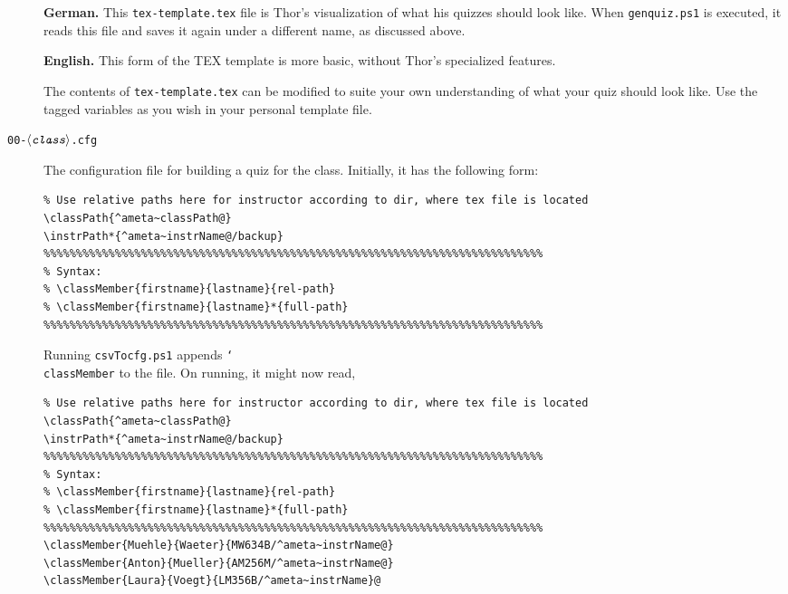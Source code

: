 \documentclass{article}
\let\pkg\textsf
\def\cs#1{\texttt{\char`\\#1}}
\def\ameta#1{\ensuremath{\langle\textit{\texttt{#1}}\rangle}}
\begin{document}
\begin{description}
      \textbf{German.} This \texttt{tex-template.tex} file is
      Thor's visualization of what his quizzes should look
      like. When \texttt{genquiz.ps1} is executed, it reads
      this file and saves it again under a different name, as
      discussed above.

      \textbf{English.} This form of the TEX template is more
      basic, without Thor's specialized features.

      The contents of \texttt{tex-template.tex} can be
      modified to suite your own understanding of what your
      quiz should look like. Use the tagged variables as you
      wish in your personal template file.

  \item[\normalfont\texttt{00-\ameta{class}.cfg}] The configuration file
      for building a quiz for the class. Initially, it has the
      following form:
\begin{Verbatim}[fontsize=\small,commandchars={^~@}]
% Reset the paths for \instrPath and \classPath for your system
% Use relative paths here for instructor according to dir, where tex file is located
\classPath{^ameta~classPath@}
\instrPath*{^ameta~instrName@/backup}
%%%%%%%%%%%%%%%%%%%%%%%%%%%%%%%%%%%%%%%%%%%%%%%%%%%%%%%%%%%%%%%%%%%%%%%%%%%%%
% Syntax:
% \classMember{firstname}{lastname}{rel-path}
% \classMember{firstname}{lastname}*{full-path}
%%%%%%%%%%%%%%%%%%%%%%%%%%%%%%%%%%%%%%%%%%%%%%%%%%%%%%%%%%%%%%%%%%%%%%%%%%%%%
\end{Verbatim}
Running \texttt{csvTocfg.ps1} appends \cs{classMember} to the file. On running, it might now read,
\begin{Verbatim}[fontsize=\small,commandchars={^~@}]
% Reset the paths for \instrPath and \classPath for your system
% Use relative paths here for instructor according to dir, where tex file is located
\classPath{^ameta~classPath@}
\instrPath*{^ameta~instrName@/backup}
%%%%%%%%%%%%%%%%%%%%%%%%%%%%%%%%%%%%%%%%%%%%%%%%%%%%%%%%%%%%%%%%%%%%%%%%%%%%%
% Syntax:
% \classMember{firstname}{lastname}{rel-path}
% \classMember{firstname}{lastname}*{full-path}
%%%%%%%%%%%%%%%%%%%%%%%%%%%%%%%%%%%%%%%%%%%%%%%%%%%%%%%%%%%%%%%%%%%%%%%%%%%%%
\classMember{Muehle}{Waeter}{MW634B/^ameta~instrName@}
\classMember{Anton}{Mueller}{AM256M/^ameta~instrName@}
\classMember{Laura}{Voegt}{LM356B/^ameta~instrName}@
\end{Verbatim}




\end{description}
\end{document}

